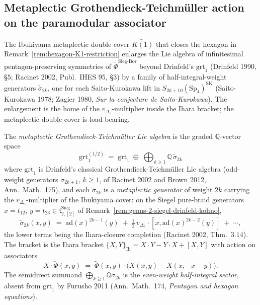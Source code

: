 \subsection{Metaplectic Grothendieck-Teichm\"uller action on the paramodular associator}
\label{subsec:grt-metaplectic-paramodular}

The Ibukiyama metaplectic double cover $\widetilde{K(1)}$ that closes
the hexagon in Remark~\ref{rem:hexagon-K1-restriction} enlarges the
Lie algebra of infinitesimal pentagon-preserving symmetries of
$\widetilde\Phi^{\mathrm{Sieg\text{-}Bor}}$ beyond Drinfeld's
$\mathrm{grt}_1$ (Drinfeld 1990, \S $5$; Racinet 2002, Publ.\ IHES 95,
\S $3$) by a family of half-integral-weight generators
$\widetilde\sigma_{2k}$, one for each Saito-Kurokawa lift in
$S_{2k + 10}(\mathrm{Sp}_4)^{\mathrm{SK}}$ (Saito-Kurokawa 1978;
Zagier 1980, \emph{Sur la conjecture de Saito-Kurokawa}). The
enlargement is the home of the $v_{\Delta_5}$-multiplier inside the
Ihara bracket; the metaplectic double cover is load-bearing.

\begin{definition}
\label{def:grt-half}
The \emph{metaplectic Grothendieck-Teichm\"uller Lie algebra} is the graded
$\mathbb{Q}$-vector space
\[
 \mathrm{grt}_1^{(1/2)}
 \;=\;
 \mathrm{grt}_1 \;\oplus\; \bigoplus_{k\geq 1}\mathbb{Q}\,\widetilde\sigma_{2k}
\]
where $\mathrm{grt}_1$ is Drinfeld's classical Grothendieck-Teichm\"uller Lie
algebra (odd-weight generators $\sigma_{2k+1}$, $k\geq 1$, of Racinet 2002 and
Brown 2012, Ann.\ Math.\ 175), and each $\widetilde\sigma_{2k}$ is a
\emph{metaplectic generator} of weight $2k$ carrying the $v_{\Delta_5}$-multiplier
of the Ibukiyama cover: on the Siegel pure-braid generators $x=t_{12}$,
$y=t_{23}\in\mathfrak{t}^{\mathrm{Sieg}}_{2,[2]}$ of
Remark~\ref{rem:genus-2-siegel-drinfeld-kohno},
\[
 \widetilde\sigma_{2k}(x,y)
 \;=\;
 \mathrm{ad}(x)^{2k-1}(y)
 \;+\;\tfrac{1}{2}\,v_{\Delta_5}\cdot[x,\mathrm{ad}(x)^{2k-2}(y)]
 \;+\;\cdots,
\]
the lower terms being the Ihara-closure completion (Racinet 2002, Thm.~$3.14$).
The bracket is the Ihara bracket
$\{X,Y\}_{\mathrm{Ih}} = X\cdot Y - Y\cdot X + [X,Y]$
with action on associators
\[
 X\cdot \widetilde\Phi(x,y)
 \;=\;
 \widetilde\Phi(x,y)\cdot\bigl(X(x,y) - X(x,-x-y)\bigr).
\]
The semidirect summand $\bigoplus_{k\geq 1}\mathbb{Q}\widetilde\sigma_{2k}$ is the
\emph{even-weight half-integral sector}, absent from $\mathrm{grt}_1$ by Furusho 2011
(Ann.\ Math.\ 174, \emph{Pentagon and hexagon equations}).
\end{definition}

